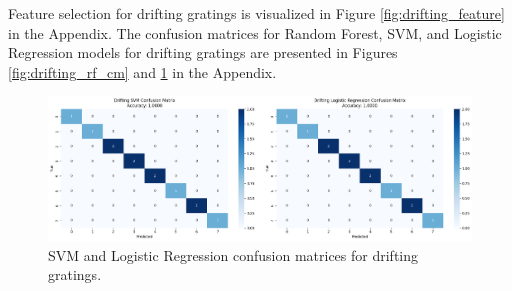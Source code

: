 \documentclass[10pt,twocolumn]{article}
\begin{document}
Feature selection for drifting gratings is visualized in Figure \ref{fig:drifting_feature} in the Appendix. The confusion matrices for Random Forest, SVM, and Logistic Regression models for drifting gratings are presented in Figures \ref{fig:drifting_rf_cm} and \ref{fig:drifting_svm_logr_cm} in the Appendix.

\begin{figure}[H]
  \centering
  \includegraphics[width=\linewidth]{report_images/drifting_SVM_LogR_confusion_matrix.png}
  \caption{SVM and Logistic Regression confusion matrices for drifting gratings.}
  \label{fig:drifting_svm_logr_cm}
\end{figure}
\end{document}

